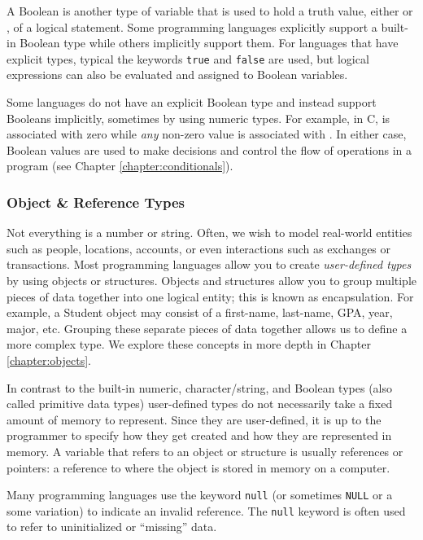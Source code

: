 A \gls{Boolean} is another type of variable that is used to hold a truth value, 
either \True or \False, of a logical statement.  Some programming languages 
explicitly support a built-in Boolean type while others implicitly support them.
For languages that have explicit types, typical the keywords \texttt{true}
and \texttt{false} are used, but logical expressions can also be evaluated
and assigned to Boolean variables.  

Some languages do not have an explicit Boolean type and instead support
Booleans implicitly, sometimes by using numeric types.  For example, in C, 
\False is associated with zero while \emph{any} non-zero value is associated
with \True.  In either case, Boolean values are used to make
decisions and control the flow of operations in a program (see 
Chapter \ref{chapter:conditionals}).

\subsubsection{Object \& Reference Types}

Not everything is a number or string.  Often, we wish to model real-world entities
such as people, locations, accounts, or even interactions such as exchanges or
transactions.  Most programming languages allow you to create 
\emph{user-defined types} by using objects or structures.  Objects and structures
allow you to group multiple pieces of data together into one logical
entity; this is known as \gls{encapsulation}.  For example, a Student object
may consist of a first-name, last-name, GPA, year, major, etc.  Grouping
these separate pieces of data together allows us to define a more complex
type.  We explore these concepts in more depth in Chapter \ref{chapter:objects}.

In contrast to the built-in numeric, character/string, and Boolean types (also called
\gls{primitive} data types) user-defined types do not necessarily take a fixed
amount of memory to represent.  Since they are user-defined, it is up to the
programmer to specify how they get created and how they are represented in
memory.  A variable that refers to an object or structure is usually \glspl{reference}
or \glspl{pointer}: a reference to where the object is stored in memory on a 
computer.  

Many programming languages use the keyword \texttt{null} (or sometimes
\texttt{NULL} or a some variation) to indicate an invalid reference.  
The \texttt{null} keyword is often used to refer to uninitialized or
``missing'' data.

